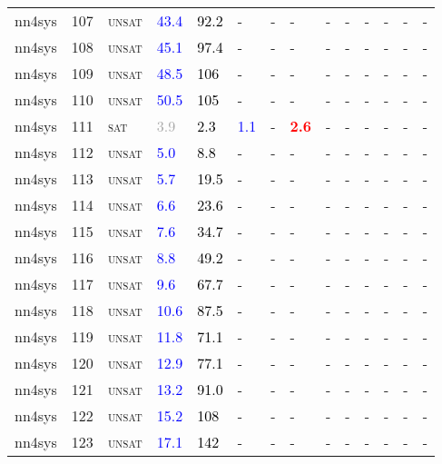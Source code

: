 \begin{center}
{\begin{longtable}{@{}llllllllllllll@{}}
nn4sys & 107 & \textsc{unsat} & \textcolor{blue}{43.4} & \textcolor{black}{92.2} & - & - & - & - & - & - & - & - & - \\
nn4sys & 108 & \textsc{unsat} & \textcolor{blue}{45.1} & \textcolor{black}{97.4} & - & - & - & - & - & - & - & - & - \\
nn4sys & 109 & \textsc{unsat} & \textcolor{blue}{48.5} & \textcolor{black}{106} & - & - & - & - & - & - & - & - & - \\
nn4sys & 110 & \textsc{unsat} & \textcolor{blue}{50.5} & \textcolor{black}{105} & - & - & - & - & - & - & - & - & - \\
nn4sys & 111 & \textsc{sat} & \textcolor{darkgray}{3.9} & \textcolor{black}{2.3} & \textcolor{blue}{1.1} & - & \textbf{\textcolor{red}{2.6}} & - & - & - & - & - & - \\
nn4sys & 112 & \textsc{unsat} & \textcolor{blue}{5.0} & \textcolor{black}{8.8} & - & - & - & - & - & - & - & - & - \\
nn4sys & 113 & \textsc{unsat} & \textcolor{blue}{5.7} & \textcolor{black}{19.5} & - & - & - & - & - & - & - & - & - \\
nn4sys & 114 & \textsc{unsat} & \textcolor{blue}{6.6} & \textcolor{black}{23.6} & - & - & - & - & - & - & - & - & - \\
nn4sys & 115 & \textsc{unsat} & \textcolor{blue}{7.6} & \textcolor{black}{34.7} & - & - & - & - & - & - & - & - & - \\
nn4sys & 116 & \textsc{unsat} & \textcolor{blue}{8.8} & \textcolor{black}{49.2} & - & - & - & - & - & - & - & - & - \\
nn4sys & 117 & \textsc{unsat} & \textcolor{blue}{9.6} & \textcolor{black}{67.7} & - & - & - & - & - & - & - & - & - \\
nn4sys & 118 & \textsc{unsat} & \textcolor{blue}{10.6} & \textcolor{black}{87.5} & - & - & - & - & - & - & - & - & - \\
nn4sys & 119 & \textsc{unsat} & \textcolor{blue}{11.8} & \textcolor{black}{71.1} & - & - & - & - & - & - & - & - & - \\
nn4sys & 120 & \textsc{unsat} & \textcolor{blue}{12.9} & \textcolor{black}{77.1} & - & - & - & - & - & - & - & - & - \\
nn4sys & 121 & \textsc{unsat} & \textcolor{blue}{13.2} & \textcolor{black}{91.0} & - & - & - & - & - & - & - & - & - \\
nn4sys & 122 & \textsc{unsat} & \textcolor{blue}{15.2} & \textcolor{black}{108} & - & - & - & - & - & - & - & - & - \\
nn4sys & 123 & \textsc{unsat} & \textcolor{blue}{17.1} & \textcolor{black}{142} & - & - & - & - & - & - & - & - & - \\

\end{longtable}}
\end{center}
